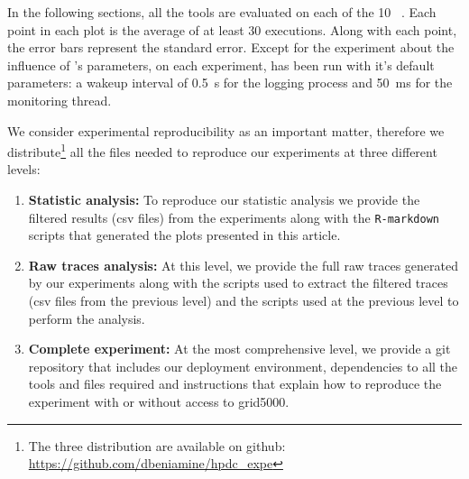 In the following sections, all the tools are
evaluated on each of the 10 \NPB~\cite{Jin1999}.
Each point in each plot is the average of at least $30$ executions. Along with each point,
the error bars represent the standard error.
Except for the experiment about the influence of \Moca's parameters, on each
experiment, \Moca has been run with it's default parameters: a wakeup interval of
\SI{0.5}{s} for the logging process and \SI{50}{ms} for the monitoring thread.


We consider experimental reproducibility as an important matter, therefore we
distribute\footnote{The three distribution are available on github:\\
    \url{https://github.com/dbeniamine/hpdc_expe}}
all the files needed to reproduce our experiments at three different levels:

\begin{enumerate}
    \item \textbf{Statistic analysis:} To reproduce our statistic analysis we provide
        the filtered results (csv files) from the experiments along with the
        \texttt{R-markdown} scripts that generated the plots presented in this
        article.
    \item \textbf{Raw traces analysis:} At this level, we provide the full raw traces
        generated by our experiments along with the scripts used to extract the
        filtered traces (csv files from the previous level) and the scripts used
	at the previous level to perform the analysis.
    \item \textbf{Complete experiment:} At the most comprehensive level, we provide a git
        repository that includes our deployment environment, dependencies to all the
        tools and files required and instructions that explain how
        to reproduce the experiment with or without access to grid5000.
\end{enumerate}


